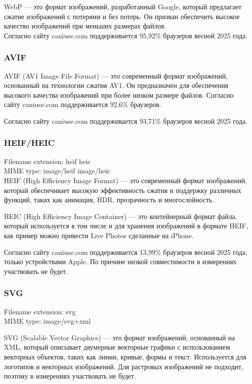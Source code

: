 \documentclass[12pt]{article}
\begin{document}
WebP — это формат изображений, разработанный Google, который предлагает сжатие изображений
с потерями и без потерь. Он призван обеспечить высокое качество изображений при меньших размерах файлов.\\

Согласно сайту caniuse.com поддерживается 95,92\% браузеров весной 2025 года.

\subsubsection{AVIF}

AVIF (AV1 Image File Format) — это современный формат изображений,
основанный на технологии сжатия AV1. Он предназначен для обеспечения высокого
качества изображений при более низком размере файлов. Согласно сайту caniuse.com
поддерживается 92,6\% браузеров.

Согласно сайту caniuse.com поддерживается 93,71\% браузеров весной 2025 года.

\subsubsection{HEIF/HEIC}

Filename extension: heif heic\\
MIME type: image/heif image/heic\\

HEIF (High Efficiency Image Format) — это современный формат изображений,
который обеспечивает высокую эффективность сжатия и поддержку различных функций,
таких как анимация, HDR, прозрачность и многослойность.

HEIC (High Efficiency Image Container) — это контейнерный формат файла,
который используется в том числе и для хранения изображений в формате HEIF,
как пример можно привести Live Photos сделанные на iPhone.

Согласно сайту caniuse.com поддерживается 13,99\% браузеров весной 2025 года,
только устройствами Apple. По причине низкой совместимости в измерениях участвовать не будет.

\subsubsection{SVG}

Filename extension: svg\\
MIME type: image/svg+xml

SVG (Scalable Vector Graphics) — это формат изображений, основанный на XML,
который описывает двумерные векторные графики с использованием векторных объектов,
таких как линии, кривые, формы и текст. Используется для логотипов и векторных изображений.
Для растровых изображений не подходит, поэтому в измерениях участвовать не будет.
\end{document}
